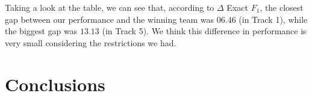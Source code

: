 \documentclass[11pt]{article}
\begin{document}



Taking a look at the table, we can see that, according to $\Delta$ Exact $F_1$, the closest gap between our performance and the winning team was $06.46$ (in Track 1), while the biggest gap was $13.13$ (in Track 5).
We think this difference in performance is very small considering the restrictions we had.



\section{Conclusions}
\label{sec:conclusions}
\end{document}
